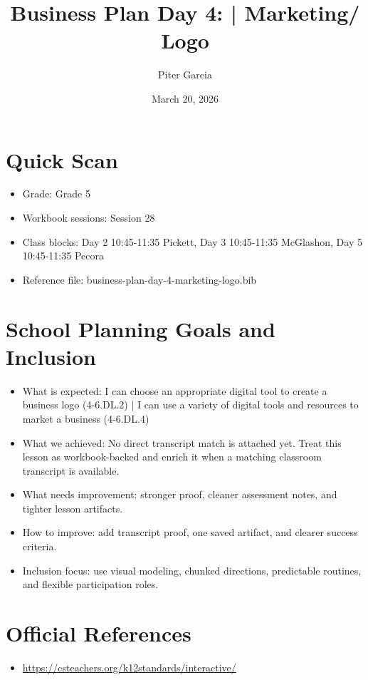 \documentclass[11pt]{article}
\title{Business Plan Day 4: | Marketing/ Logo}
\author{Piter Garcia}
\date{March 20, 2026}
\begin{document}
\maketitle
\section*{Quick Scan}
\begin{itemize}[leftmargin=*]
\item Grade: Grade 5
\item Workbook sessions: Session 28
\item Class blocks: Day 2 10:45-11:35 Pickett, Day 3 10:45-11:35 McGlashon, Day 5 10:45-11:35 Pecora
\item Reference file: business-plan-day-4-marketing-logo.bib
\end{itemize}
\section*{School Planning Goals and Inclusion}
\begin{itemize}[leftmargin=*]
\item What is expected: I can choose an appropriate digital tool to create a business logo (4-6.DL.2) | I can use a variety of digital tools and resources to market a business (4-6.DL.4)
\item What we achieved: No direct transcript match is attached yet. Treat this lesson as workbook-backed and enrich it when a matching classroom transcript is available.
\item What needs improvement: stronger proof, cleaner assessment notes, and tighter lesson artifacts.
\item How to improve: add transcript proof, one saved artifact, and clearer success criteria.
\item Inclusion focus: use visual modeling, chunked directions, predictable routines, and flexible participation roles.
\end{itemize}
\section*{Official References}
\begin{itemize}[leftmargin=*]
\item \url{https://csteachers.org/k12standards/interactive/}

\end{itemize}
\end{document}

